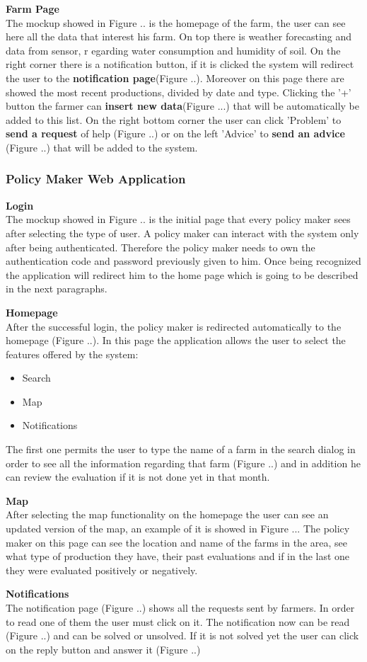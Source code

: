 \textbf{Farm Page}\\ 
The mockup showed in Figure .. is the homepage of the farm, the user can see here all the data that interest his farm. On top there is weather forecasting and data from sensor, r
egarding water consumption and humidity of soil. On the right corner there is a notification button, if it is clicked the system will redirect the user to the \textbf{notification page}(Figure ..).
Moreover on this page there are showed the most recent productions, divided by date and type. Clicking the '+' button the farmer can \textbf{insert new data}(Figure ...) that will be automatically be added to this list.
On the right bottom corner the user can click 'Problem' to \textbf{send a request} of help (Figure ..) or on the left 'Advice' to \textbf{send an advice} (Figure ..) that will be added to the system.


\subsubsection{Policy Maker Web Application}
\textbf{Login} \\
The mockup showed in Figure .. is the initial page that every policy maker sees after selecting the type of user.
A policy maker can interact with the system only after being authenticated. Therefore the policy maker needs to own the authentication code and password previously given to him.
Once being recognized the application will redirect him to the home page which is going to be described in the next paragraphs.

\textbf{Homepage} \\
After the successful login, the policy maker is redirected automatically to the homepage (Figure ..). 
In this page the application allows the user to select the features offered by the system:
\begin{itemize}
    \item Search
    \item Map
    \item Notifications
\end{itemize}
The first one permits the user to type the name of a farm in the search dialog in order to see all the information regarding that farm (Figure ..) and in addition he can review the evaluation if it is not done yet in that month.

\textbf{Map} \\
After selecting the map functionality on the homepage the user can see an updated version of the map, 
an example of it is showed in Figure ... 
The policy maker on this page can see the location and name of the farms in the area, see what type of production 
they have, their past evaluations and if in the last one they were evaluated positively or negatively.

\textbf{Notifications} \\
The notification page (Figure ..) shows all the requests sent by farmers. In order to read one of them the user must click on it. The notification now can be read (Figure ..) and can be solved or unsolved. 
If it is not solved yet the user can click on the reply button and answer it (Figure ..)
